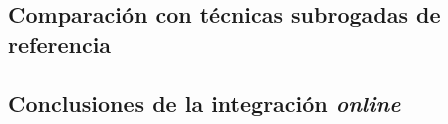 
\subsection{Comparación con técnicas subrogadas de referencia}



\subsection{Conclusiones de la integración \textit{online}}















